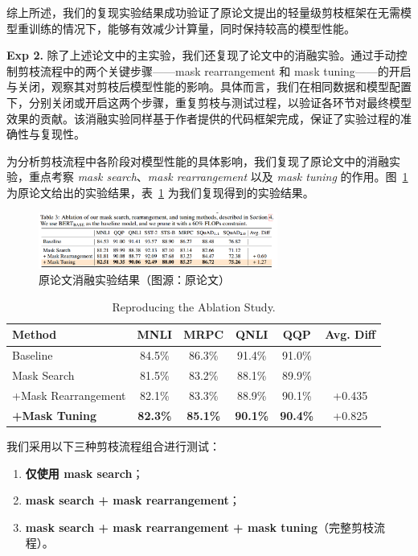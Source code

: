 \documentclass[UTF8,openany]{ctexbook}
\begin{document}
综上所述，我们的复现实验结果成功验证了原论文提出的轻量级剪枝框架在无需模型重训练的情况下，能够有效减少计算量，同时保持较高的模型性能。

\noindent\textbf{Exp 2.} 除了上述论文中的主实验，我们还复现了论文中的消融实验。通过手动控制剪枝流程中的两个关键步骤——mask rearrangement 和 mask tuning——的开启与关闭，观察其对剪枝后模型性能的影响。具体而言，我们在相同数据和模型配置下，分别关闭或开启这两个步骤，重复剪枝与测试过程，以验证各环节对最终模型效果的贡献。该消融实验同样基于作者提供的代码框架完成，保证了实验过程的准确性与复现性。

为分析剪枝流程中各阶段对模型性能的具体影响，我们复现了原论文中的消融实验，重点考察 \textit{mask search}、\textit{mask rearrangement} 以及 \textit{mask tuning} 的作用。图~\ref{fig:ablation_original} 为原论文给出的实验结果，表~\ref{tab:ablation_results} 为我们复现得到的实验结果。

\begin{figure}[H]
    \centering
    \includegraphics[width=0.7\textwidth]{img/yunlunwenxiao.png}
    \caption{原论文消融实验结果（图源：原论文）}
    \label{fig:ablation_original}
\end{figure}

\begin{table}[ht]
    \centering
    \caption{Reproducing the Ablation Study.}
    \label{tab:ablation_results}
    \begin{tabular}{lcccc|c}
    \toprule
    Method & MNLI & MRPC & QNLI & QQP & Avg. Diff \\
    \midrule
    Baseline & 84.5\% & 86.3\% & 91.4\% & 91.0\% \\
    \cmidrule(lr){1-5}
    Mask Search & 81.5\% & 83.2\% & 88.1\% & 89.9\% \\
    +Mask Rearrangement & 82.1\% & 83.3\% & 88.9\% & 90.1\% & +0.435 \\
    \textbf{+Mask Tuning} & \textbf{82.3\%} & \textbf{85.1\%} & \textbf{90.1\%} & \textbf{90.4\%} & +0.825 \\
    \bottomrule
    \end{tabular}
\end{table}

我们采用以下三种剪枝流程组合进行测试：

\begin{enumerate}[itemsep=0pt, topsep=0pt, parsep=0pt, partopsep=0pt]
    \item \textbf{仅使用 mask search}；
    \item \textbf{mask search + mask rearrangement}；
    \item \textbf{mask search + mask rearrangement + mask tuning}（完整剪枝流程）。
\end{enumerate}
\end{document}
